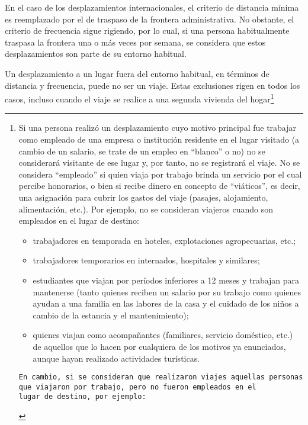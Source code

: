 \documentclass[
  openany]{book}
\begin{document}
En el caso de los desplazamientos internacionales, el criterio de distancia mínima es reemplazado por el de traspaso de la frontera administrativa.
No obstante, el criterio de frecuencia sigue rigiendo, por lo cual, si una persona habitualmente traspasa la frontera una o más veces por semana, se considera que estos desplazamientos son parte de su entorno habitual.

Un desplazamiento a un lugar fuera del entorno habitual, en términos de distancia y frecuencia, puede no ser un viaje.
Estas exclusiones rigen en todos los casos, incluso cuando el viaje se realice a una segunda vivienda del hogar\footnote{Si una persona realizó un desplazamiento cuyo motivo principal fue trabajar como empleado de una empresa o institución residente en el lugar visitado (a cambio de un salario, se trate de un empleo en ``blanco'' o no) no se considerará visitante de ese lugar y, por tanto, no se registrará el viaje.
  No se considera ``empleado'' si quien viaja por trabajo brinda un servicio por el cual percibe honorarios, o bien si recibe dinero en concepto de ``viáticos'', es decir, una asignación para cubrir los gastos del viaje (pasajes, alojamiento, alimentación, etc.).
  Por ejemplo, no se consideran viajeros cuando son empleados en el lugar de destino:

  \begin{itemize}
  \item
    trabajadores en temporada en hoteles, explotaciones agropecuarias, etc.;
  \item
    trabajadores temporarios en internados, hospitales y similares;
  \item
    estudiantes que viajan por períodos inferiores a 12 meses y trabajan para mantenerse (tanto quienes reciben un salario por su trabajo como quienes ayudan a una familia en las labores de la casa y el cuidado de los niños a cambio de la estancia y el mantenimiento);
  \item
    quienes viajan como acompañantes (familiares, servicio doméstico, etc.) de aquellos que lo hacen por cualquiera de los motivos ya enunciados, aunque hayan realizado actividades turísticas.
  \end{itemize}

\begin{Verbatim}
En cambio, si se consideran que realizaron viajes aquellas personas que viajaron por trabajo, pero no fueron empleados en el
lugar de destino, por ejemplo:
\end{Verbatim}

}
\end{document}

